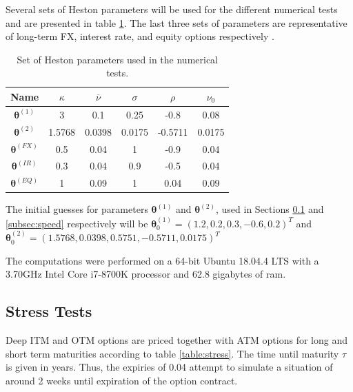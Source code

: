 \documentclass[12,twoside]{mammeTFM}
\theoremstyle{definition}
\theoremstyle{remark}
\begin{document}
Several sets of Heston parameters will be used for the different numerical tests and are presented in table \ref{table:heston_params}. The last three sets of parameters are representative of long-term FX, interest rate, and equity options respectively \cite{and08}.

\begin{table}[h]
\begin{center}
 \begin{tabular}{|c | c | c | c | c | c |} 
 \hline
 Name & $\kappa$ & $\overline{\nu}$ & $\sigma$ & $\rho$ & $\nu_0$ \\ [0.5ex] 
 \hline
 $\boldsymbol{\theta}^{(1)}$ & 3 & 0.1 & 0.25 & -0.8 & 0.08 \\ 
 \hline
 $\boldsymbol{\theta}^{(2)}$ & 1.5768 & 0.0398 & 0.0175 & -0.5711 & 0.0175 \\ 
 \hline
 $\boldsymbol{\theta}^{(FX)}$ & 0.5 & 0.04 & 1 & -0.9 & 0.04 \\ 
 \hline
 $\boldsymbol{\theta}^{(IR)}$ & 0.3 & 0.04 & 0.9 & -0.5 & 0.04 \\ 
 \hline
 $\boldsymbol{\theta}^{(EQ)}$ & 1 & 0.09 & 1 & 0.04 & 0.09 \\ 
 \hline
\end{tabular}
\end{center}
\caption{Set of Heston parameters used in the numerical tests.}\label{table:heston_params}
\end{table}

The initial guesses for parameters $\boldsymbol{\theta}^{(1)}$ and $\boldsymbol{\theta}^{(2)}$, used in Sections \ref{subsec:stress} and \ref{subsec:speed} respectively will be $\boldsymbol{\theta}^{(1)}_{0} = (1.2, 0.2, 0.3, -0.6, 0.2)^{T}$ and $\boldsymbol{\theta}^{(2)}_{0} = (1.5768, 0.0398, 0.5751, -0.5711, 0.0175)^{T}$

The computations were performed on a 64-bit Ubuntu 18.04.4 LTS with a 3.70GHz Intel Core i7-8700K processor and 62.8 gigabytes of ram.
\subsection{Stress Tests}\label{subsec:stress}

Deep ITM and OTM options are priced together with ATM options for long and short term maturities according to table \ref{table:stress}. The time until maturity $\tau$ is given in years. Thus, the expiries of 0.04 attempt to simulate a situation of around 2 weeks until expiration of the option contract.
\end{document}
